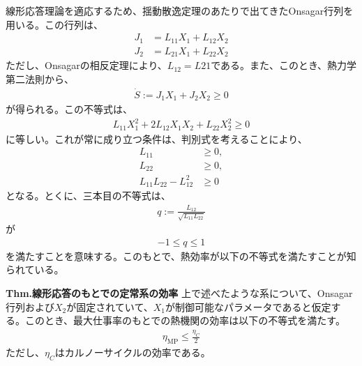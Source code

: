 \documentclass[a4paper,11pt]{jsarticle}
\numberwithin{equation}{section}
\begin{document}
線形応答理論を適応するため、揺動散逸定理のあたりで出てきたOnsagar行列を用いる。この行列は、
\begin{align}
    J_1 &= L_{11} X_1 + L_{12} X_2\\
    J_2 &= L_{21} X_1 + L_{22} X_2
\end{align}
ただし、Onsagarの相反定理により、$L_{12} = L{21}$である。また、このとき、熱力学第二法則から、
\begin{align}
    \dot{S} := J_1 X_1 + J_2 X_2 \geq 0
\end{align}
が得られる。この不等式は、
\begin{align}
  L_{11} X_1^2 + 2L_{12} X_1 X_2 + L_{22} X_2^2 \geq 0
\end{align}
に等しい。これが常に成り立つ条件は、判別式を考えることにより、
\begin{align}
    L_{11} &\geq 0,  \\
    L_{22} &\geq 0,  \\
    L_{11}L_{22} - L_{12}^2 &\geq 0
\end{align}
となる。とくに、三本目の不等式は、
\begin{align}
    q := \frac{L_{12}}{\sqrt{L_{11}L_{22}}}
\end{align}
が
\begin{align}
  -1 \leq q \leq 1
\end{align}
を満たすことを意味する。このもとで、熱効率が以下の不等式を満たすことが知られている。

\begin{itembox}[l]{\textbf{Thm.線形応答のもとでの定常系の効率}}
  上で述べたような系について、Onsagar行列および$X_2$が固定されていて、$X_1$が制御可能なパラメータであると仮定する。このとき、最大仕事率のもとでの熱機関の効率は以下の不等式を満たす。
  \begin{align}
    \eta_{\text{MP}} \leq \frac{\eta_C}{2} 
  \end{align}
  ただし、$\eta_C$はカルノーサイクルの効率である。
\end{itembox}
\end{document}
